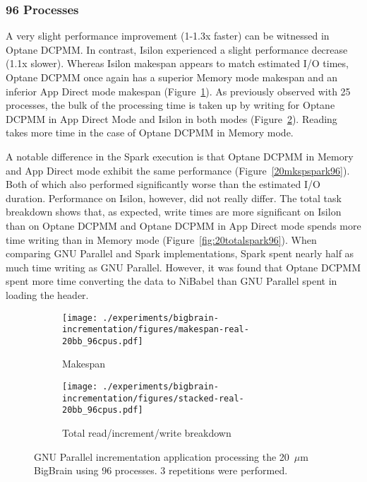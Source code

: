 \documentclass[conference]{IEEEtran}
\begin{document}
\subsubsection{96 Processes}

A very slight performance improvement (1-1.3x faster) can be witnessed in Optane DCPMM. In 
contrast, Isilon 
experienced a slight performance decrease (1.1x slower). Whereas Isilon makespan appears to match
estimated I/O times, Optane DCPMM once again has a superior Memory mode makespan and an inferior App Direct
mode makespan (Figure~\ref{fig:20mksp96}). As previously observed with 25 processes,
the bulk of the processing time is taken up by writing for Optane DCPMM in App Direct Mode and 
Isilon in both modes (Figure~\ref{fig:20total96}). Reading takes more time in the case of Optane DCPMM 
in Memory mode. 


A notable difference in the Spark execution is that Optane DCPMM in Memory and App Direct mode
exhibit the same performance (Figure~\ref{20mkspspark96}). Both of which also performed
significantly worse than the estimated I/O duration. Performance on Isilon, however, did
not really differ. The total task breakdown shows that, as expected, write times are more
significant on Isilon than on Optane DCPMM and Optane DCPMM in App Direct mode spends more time writing
than in Memory mode (Figure~\ref{fig:20totalspark96}). When comparing GNU Parallel and 
Spark implementations, Spark spent nearly half as much time writing as GNU Parallel. However,
it was found that Optane DCPMM spent more time converting the data to NiBabel than GNU Parallel spent
in loading the header.

\begin{figure*}
    \begin{subfigure}{\columnwidth}
        \centering
    \texttt{[image: ./experiments/bigbrain-incrementation/figures/makespan-real-20bb\_96cpus.pdf]}
    \caption{Makespan}\label{fig:20mksp96}
\end{subfigure}
\begin{subfigure}{\columnwidth}
        \centering
    \texttt{[image: ./experiments/bigbrain-incrementation/figures/stacked-real-20bb\_96cpus.pdf]}
    \caption{Total read/increment/write breakdown}\label{fig:20total96}
\end{subfigure}
\caption{GNU Parallel incrementation application processing the 20~$\mu$m BigBrain using
96 processes. 3 repetitions were performed.}\label{fig:2096}
\end{figure*}
\end{document}
